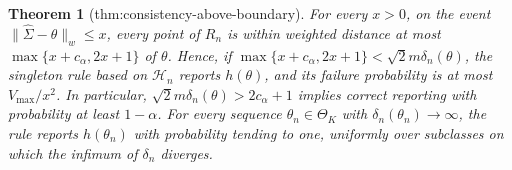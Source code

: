 \documentclass{article}
\newtheorem{theorem}{Theorem}
\begin{document}
\begin{theorem}[thm:consistency-above-boundary]\label{thm:consistency-above-boundary}
For every \(x>0\), on the event \(\lVert\widehat\Sigma-\theta\rVert_w\le x\), every point of \(R_n\) is within weighted distance at most \(\max\{x+c_{\alpha},2x+1\}\) of \(\theta\).  Hence, if \(\max\{x+c_{\alpha},2x+1\}<\sqrt{2}m\delta_n(\theta)\), the singleton rule based on \(\mathcal H_n\) reports \(h(\theta)\), and its failure probability is at most \(V_{\max}/x^2\).  In particular, \(\sqrt{2}m\delta_n(\theta)>2c_{\alpha}+1\) implies correct reporting with probability at least \(1-\alpha\).  For every sequence \(\theta_n\in\Theta_K\) with \(\delta_n(\theta_n)\to\infty\), the rule reports \(h(\theta_n)\) with probability tending to one, uniformly over subclasses on which the infimum of \(\delta_n\) diverges.
\end{theorem}
\end{document}
